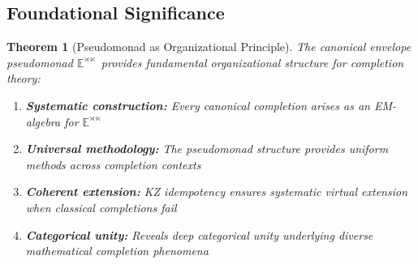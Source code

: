 \documentclass[11pt]{article}
\theoremstyle{plain}
\newtheorem{theorem}{Theorem}[section]
\theoremstyle{definition}
\theoremstyle{remark}
\begin{document}
\subsection{Foundational Significance}

\begin{theorem}[Pseudomonad as Organizational Principle]
The canonical envelope pseudomonad $\mathbb{E}^{\rtimes \ltimes}$ provides fundamental organizational structure for completion theory:

\begin{enumerate}
\item \textbf{Systematic construction:} Every canonical completion arises as an EM-algebra for $\mathbb{E}^{\rtimes \ltimes}$

\item \textbf{Universal methodology:} The pseudomonad structure provides uniform methods across completion contexts

\item \textbf{Coherent extension:} KZ idempotency ensures systematic virtual extension when classical completions fail

\item \textbf{Categorical unity:} Reveals deep categorical unity underlying diverse mathematical completion phenomena
\end{enumerate}
\end{theorem}
\end{document}

